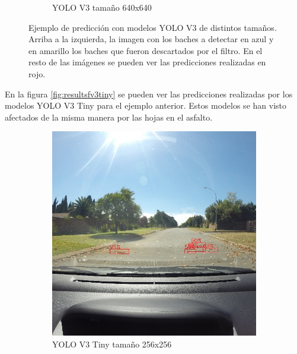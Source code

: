 \begin{figure}[H]
\begin{subfigure}[h]{0.45\linewidth}
		\caption{YOLO V3 tamaño 640x640}
	\end{subfigure}
	\caption{Ejemplo de predicción con modelos YOLO V3 de distintos tamaños. Arriba a la izquierda, la imagen con los baches a detectar en azul y en amarillo los baches que fueron descartados por el filtro. En el resto de las imágenes se pueden ver las predicciones realizadas en rojo.}
	\label{fig:resultsfv3}
\end{figure}

En la figura \ref{fig:resultsfv3tiny} se pueden ver las predicciones realizadas por los modelos YOLO V3 Tiny para el ejemplo anterior. Estos modelos se han visto afectados de la misma manera por las hojas en el asfalto.

\begin{figure}[H]
	\centering
	\begin{subfigure}[h]{0.45\linewidth}
		\includegraphics[width=\linewidth]{images/results_f_yolo_v3_tiny_256.jpg}
		\caption{YOLO V3 Tiny tamaño 256x256}
	\end{subfigure}
	\begin{subfigure}[h]{0.45\linewidth}

\end{subfigure}
\end{figure}

